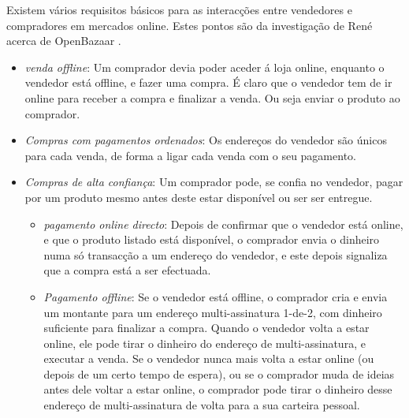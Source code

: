 Existem vários requisitos básicos para as interacções entre vendedores e compradores em mercados online. Estes pontos são da investigação de René acerca de OpenBazaar \cite{openbazaar-rbrunner-investigation}.
\begin{itemize}
    \item {\em venda offline}: 
Um comprador devia poder aceder á loja online, enquanto o vendedor está offline, e fazer uma compra. É claro que o vendedor tem de ir online para receber a compra e finalizar a venda. Ou seja enviar o produto ao comprador. 
    \item {\em Compras com pagamentos ordenados}: Os endereços do vendedor são únicos para cada venda, de forma a ligar cada venda com o seu pagamento.   
    \item {\em Compras de alta confiança}: Um comprador pode, se confia no vendedor, pagar por um produto mesmo antes deste estar disponível ou ser ser entregue. 
    \begin{itemize}
        \item {\em pagamento online directo}: Depois de confirmar que o vendedor está online, e que o produto listado está disponível, o comprador envia o dinheiro numa só transacção a um endereço do vendedor, e este depois signaliza que a compra está a ser efectuada. 
        \item {\em Pagamento offline}: Se o vendedor está offline, o comprador cria e envia um montante para um endereço multi-assinatura 1-de-2, com dinheiro suficiente para finalizar a compra. Quando o vendedor volta a estar online, ele pode tirar o dinheiro do endereço de multi-assinatura, e executar a venda. Se o vendedor nunca mais volta a estar online (ou depois de um certo tempo de espera), ou se o comprador muda de ideias antes dele voltar a estar online, o comprador pode tirar o dinheiro desse endereço de multi-assinatura de volta para a sua carteira pessoal.   

\end{itemize}
\end{itemize}
